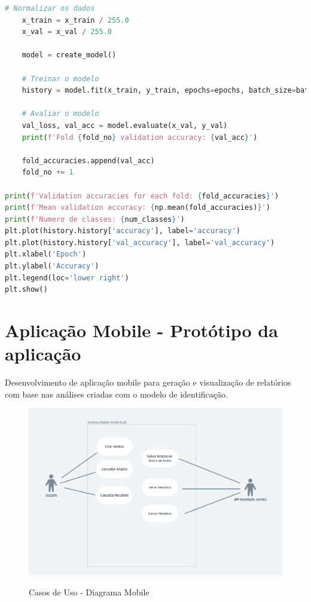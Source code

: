 \documentclass[
  a4paper,%
  12pt,%
  english,%
  brazilian,%
]{article}
\begin{document}
\begin{lstlisting}[language=Python, caption={Treinamento do modelo de aprendizagem profunda}]
    # Normalizar os dados
    x_train = x_train / 255.0
    x_val = x_val / 255.0
    
    model = create_model()
    
    # Treinar o modelo
    history = model.fit(x_train, y_train, epochs=epochs, batch_size=batch_size, validation_data=(x_val, y_val))
    
    # Avaliar o modelo
    val_loss, val_acc = model.evaluate(x_val, y_val)
    print(f'Fold {fold_no} validation accuracy: {val_acc}')
    
    fold_accuracies.append(val_acc)
    fold_no += 1

print(f'Validation accuracies for each fold: {fold_accuracies}')
print(f'Mean validation accuracy: {np.mean(fold_accuracies)}')
print(f'Numero de classes: {num_classes}')
plt.plot(history.history['accuracy'], label='accuracy')
plt.plot(history.history['val_accuracy'], label='val_accuracy')
plt.xlabel('Epoch')
plt.ylabel('Accuracy')
plt.legend(loc='lower right')
plt.show()

\end{lstlisting}


\section*{Aplicação Mobile - Protótipo da aplicação}

Desenvolvimento de aplicação mobile para geração e visualização de relatórios com base nas análises criadas com o modelo de identificação.

\begin{figure}[H]
    \centering
    \caption{Casos de Uso - Diagrama Mobile}
    \includegraphics[width=.6\textwidth,keepaspectratio]{Logos/caso-de-uso-mobile.png}
    \label{fig:mobile1}
\end{figure}
\end{document}
